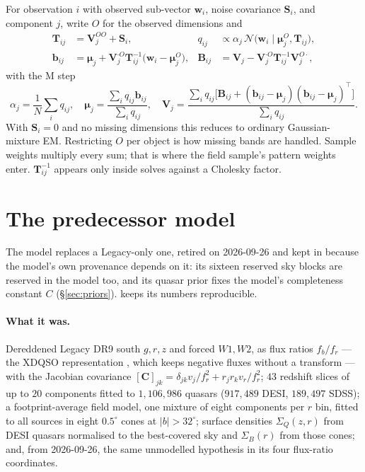 \documentclass[11pt,a4paper]{article}
\newcommand{\Sq}{\Sigma_{Q}}
\newcommand{\Sb}{\Sigma_{B}}
\begin{document}
For observation $i$ with observed sub-vector $\mathbf{w}_i$, noise covariance
$\mathbf{S}_i$, and component $j$, write $O$ for the observed dimensions and
%
\begin{align}
\mathbf{T}_{ij} &= \mathbf{V}_j^{OO} + \mathbf{S}_i, &
q_{ij} &\propto \alpha_j\,\mathcal{N}\bigl(\mathbf{w}_i\mid
        \boldsymbol{\mu}_j^{O},\mathbf{T}_{ij}\bigr), \\
\mathbf{b}_{ij} &= \boldsymbol{\mu}_j
  + \mathbf{V}_j^{\cdot O}\mathbf{T}_{ij}^{-1}
    \bigl(\mathbf{w}_i-\boldsymbol{\mu}_j^{O}\bigr), &
\mathbf{B}_{ij} &= \mathbf{V}_j
  - \mathbf{V}_j^{\cdot O}\mathbf{T}_{ij}^{-1}\mathbf{V}_j^{O\cdot},
\end{align}
%
with the M step
%
\begin{equation}
\alpha_j = \frac{1}{N}\sum_i q_{ij},
\quad
\boldsymbol{\mu}_j = \frac{\sum_i q_{ij}\mathbf{b}_{ij}}{\sum_i q_{ij}},
\quad
\mathbf{V}_j = \frac{\sum_i q_{ij}\bigl[\mathbf{B}_{ij}
   + (\mathbf{b}_{ij}-\boldsymbol{\mu}_j)
     (\mathbf{b}_{ij}-\boldsymbol{\mu}_j)^{\!\top}\bigr]}{\sum_i q_{ij}} .
\end{equation}
%
With $\mathbf{S}_i=0$ and no missing dimensions this reduces to ordinary
Gaussian-mixture EM. Restricting $O$ per object is how missing bands are
handled. Sample weights multiply every sum; that is where the field sample's
pattern weights enter. $\mathbf{T}_{ij}^{-1}$ appears only inside solves against
a Cholesky factor.

\section{The predecessor model}
\label{app:predecessor}

The model replaces a Legacy-only one, retired on 2026-09-26 and kept in
 because the model's own provenance
depends on it: its sixteen reserved sky blocks are reserved in the model too, and
its quasar prior fixes the model's completeness constant $C$
(\S\ref{sec:priors}).
 keeps its numbers reproducible.

\paragraph{What it was.} Dereddened Legacy DR9 south $g,r,z$ and forced $W1,W2$,
as flux ratios $f_b/f_r$ --- the XDQSO representation \citep{bovy2011xdqso},
which keeps negative fluxes without a transform --- with the Jacobian
covariance $[\mathbf C]_{jk}=\delta_{jk}v_j/f_r^2+r_jr_kv_r/f_r^2$; $43$ redshift
slices of up to $20$ components fitted to $1{,}106{,}986$ quasars ($917{,}489$
DESI, $189{,}497$ SDSS); a footprint-average field model, one mixture of eight
components per $r$ bin, fitted to all sources in eight $0.5^\circ$ cones at
$|b|>32^\circ$; surface densities $\Sq(z,r)$ from DESI quasars normalised to the
best-covered sky and $\Sb(r)$ from those cones; and, from 2026-09-26, the same
unmodelled hypothesis in its four flux-ratio coordinates.
\end{document}
